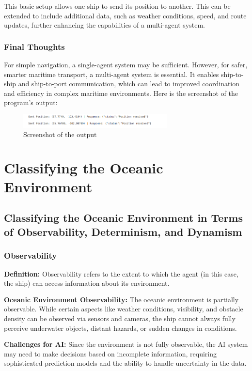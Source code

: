 \documentclass{article}
\begin{document}
This basic setup allows one ship to send its position to another. This can be extended to include additional data, such as weather conditions, speed, and route updates, further enhancing the capabilities of a multi-agent system.

\subsubsection{Final Thoughts}
For simple navigation, a single-agent system may be sufficient. However, for safer, smarter maritime transport, a multi-agent system is essential. It enables ship-to-ship and ship-to-port communication, which can lead to improved coordination and efficiency in complex maritime environments.
Here is the screenshot of the program's output:

\begin{figure}[h!]
    \centering
    \includegraphics[width=0.7\textwidth]{1_c.png} 
    \caption{Screenshot of the output}
\end{figure}
\section{Classifying the Oceanic Environment}

\subsection{Classifying the Oceanic Environment in Terms of Observability, Determinism, and Dynamism}

\subsubsection{Observability}
\textbf{Definition:} Observability refers to the extent to which the agent (in this case, the ship) can access information about its environment.

\textbf{Oceanic Environment Observability:} The oceanic environment is partially observable. While certain aspects like weather conditions, visibility, and obstacle density can be observed via sensors and cameras, the ship cannot always fully perceive underwater objects, distant hazards, or sudden changes in conditions.

\textbf{Challenges for AI:} Since the environment is not fully observable, the AI system may need to make decisions based on incomplete information, requiring sophisticated prediction models and the ability to handle uncertainty in the data.
\end{document}
